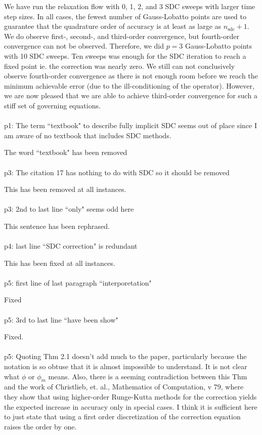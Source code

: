 \documentclass[12pt]{article}
\newcommand{\comment}[1]{{\color{blue} #1}}
\newcommand{\sdc}{{\mathrm{sdc}}}
\begin{document}
We have run the relaxation flow with 0, 1, 2, and 3 SDC sweeps with
larger time step sizes.  In all cases, the fewest number of
Gauss-Lobatto points are used to guarantee that the quadrature order
of accuracy is at least as large as $n_{\sdc}+1$.  We do observe
first-, second-, and third-order convergence, but fourth-order
convergence can not be observed.  Therefore, we did $p=3$
Gauss-Lobatto points with 10 SDC sweeps.  Ten sweeps was enough for
the SDC iteration to reach a fixed point ie. the correction was nearly
zero.  We still can not conclusively observe fourth-order convergence
as there is not enough room before we reach the minimum achievable
error (due to the ill-conditioning of the operator).  However, we are
now pleased that we are able to achieve third-order convergence for
such a stiff set of governing equations. \\ \\ \comment{p1: The term
  ``textbook" to describe fully implicit SDC seems out of place since
  I am aware of no textbook that includes SDC methods.}

The word ``textbook" has been removed \\ \\
\comment{p3: The citation 17 has nothing to do with SDC so it should be
removed}

This has been removed at all instances. \\ \\
\comment{p3: 2nd to last line ``only" seems odd here}

This sentence has been rephrased. \\ \\
\comment{p4: last line ``SDC correction" is redundant}

This has been fixed at all instances. \\ \\
\comment{p5: first line of last paragraph ``interporetation"}

Fixed \\ \\
\comment{p5: 3rd to last line ``have been show"}

Fixed. \\ \\
\comment{p5: Quoting Thm 2.1 doesn't add much to the paper, particularly
because the notation is so obtuse that it is almost impossible to
understand.  It is not clear what $\phi$ or $\phi_m$ means.  Also, there
is a seeming contradiction between this Thm and the work of Christlieb,
et. al., Mathematics of Computation, v 79, where they show that using
higher-order Runge-Kutta methods for the correction yields the expected
increase in accuracy only in special cases.  I think it is sufficient
here to just state that using a first order discretization of the
correction equation raises the order by one.}
\end{document}
